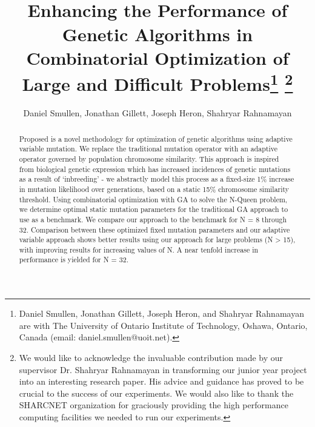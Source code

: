 \documentclass[conference]{IEEEtran}
\begin{document}
\title{\ \\ \LARGE\bf Enhancing the Performance of Genetic Algorithms in Combinatorial Optimization of Large and Difficult Problems\thanks{Daniel Smullen, Jonathan Gillett, Joseph Heron, and Shahryar Rahnamayan are with The University of Ontario Institute of Technology, Oshawa, Ontario, Canada (email: daniel.smullen@uoit.net).} \thanks{We would like to acknowledge the invaluable contribution made by our supervisor Dr. Shahryar Rahnamayan in transforming our junior year project into an interesting research paper. His advice and guidance has proved to be crucial to the success of our experiments. We would also like to thank the SHARCNET organization for graciously providing the high performance computing facilities we needed to run our experiments.}}

\author{Daniel Smullen, Jonathan Gillett, Joseph Heron, Shahryar Rahnamayan}


\maketitle

\begin{abstract}
Proposed is a novel methodology for optimization of genetic algorithms using adaptive variable mutation. We replace the traditional mutation operator with an adaptive operator governed by population chromosome similarity. This approach is inspired from biological genetic expression which has increased incidences of genetic mutations as a result of `inbreeding' - we abstractly model this process as a fixed-size 1\% increase in mutation likelihood over generations, based on a static 15\% chromosome similarity threshold. Using combinatorial optimization with GA to solve the N-Queen problem, we determine optimal static mutation parameters for the traditional GA approach to use as a benchmark. We compare our approach to the benchmark for N = 8 through 32. Comparison between these optimized fixed mutation parameters and our adaptive variable approach shows better results using our approach for large problems (N > 15), with improving results for increasing values of N. A near tenfold increase in performance is yielded for N = 32.
\end{abstract}
\end{document}
